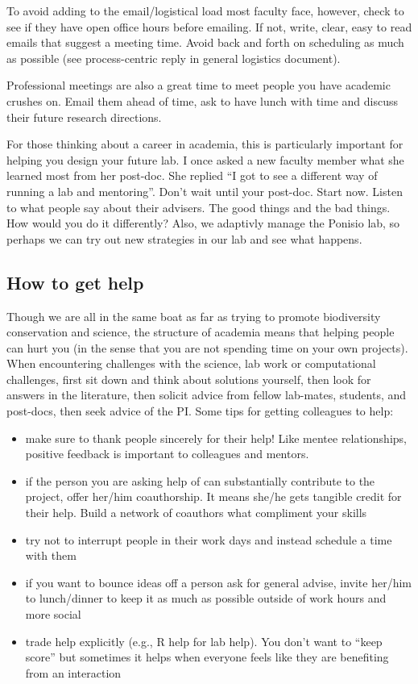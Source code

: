 \documentclass[12pt]{article}
\begin{document}
To avoid adding to the email/logistical load most faculty face,
however, check to see if they have open office hours before
emailing. If not, write, clear, easy to read emails that suggest a
meeting time. Avoid back and forth on scheduling as much as
possible (see process-centric reply in general logistics document).

Professional meetings are also a great time to meet people you have
academic crushes on. Email them ahead of time, ask to have lunch with
time and discuss their future research directions.

For those thinking about a career in academia, this is particularly
important for helping you design your future lab. I once asked a new
faculty member what she learned most from her post-doc. She replied
``I got to see a different way of running a lab and mentoring''. Don't
wait until your post-doc. Start now. Listen to what people say about
their advisers. The good things and the bad things. How would you do it
differently? Also, we adaptivly manage the Ponisio lab, so perhaps we
can try out new strategies in our lab and see what happens.

\subsection{How to get help}
\label{sec:help}
Though we are all in the same boat as far as trying to promote
biodiversity conservation and science, the structure of academia means
that helping people can hurt you (in the sense that you are not
spending time on your own projects). When encountering challenges with
the science, lab work or computational challenges, first sit down and
think about solutions yourself, then look for answers in the
literature, then solicit advice from fellow lab-mates, students, and
post-docs, then seek advice of the PI. Some tips for getting
colleagues to help:
\begin{itemize}
\item make sure to thank people sincerely for their help! Like mentee
  relationships, positive feedback is important to colleagues and
  mentors. 
\item if the person you are asking help of can substantially
  contribute to the project, offer her/him coauthorship. It means
  she/he gets tangible credit for their help. Build a network of
  coauthors what compliment your skills
\item try not to interrupt people in their work days and instead
  schedule a time with them
\item if you want to bounce ideas off a person ask for general advise,
  invite her/him to lunch/dinner to keep it as much as possible
  outside of work hours and more social
\item trade help explicitly (e.g., R help for lab help). You don't
  want to ``keep score'' but sometimes it helps when everyone feels
  like they are benefiting from an interaction
\end{itemize}
\end{document}
